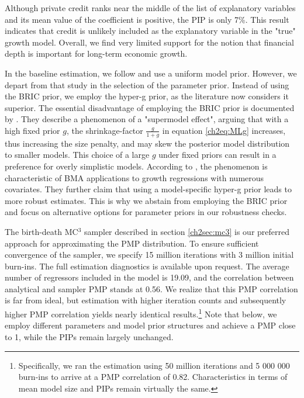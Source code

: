 \begin{refsection}
Although private credit ranks near the middle of the list of explanatory variables and its mean value of the coefficient is positive, the \ac{PIP} is only 7\%. This result indicates that credit is unlikely included as the explanatory variable in the "true" growth model. Overall, we find very limited support for the notion that financial depth is important for long-term economic growth.

In the baseline estimation, we follow \textcite{Fernandezetal2001} and use a uniform model prior. However, we depart from that study in the selection of the parameter prior. Instead of using the \ac{BRIC} prior, we employ the hyper-g prior, as the literature now considers it superior. The essential disadvantage of employing the \ac{BRIC} prior is documented by \textcite{FeldkircherZeugner2009}. They describe a phenomenon of a "supermodel effect", arguing that with a high fixed prior $g$, the shrinkage-factor $\frac{g}{1+g}$ in equation \ref{ch2eq:MLg} increases, thus increasing the size penalty, and may skew the posterior model distribution to smaller models. This choice of a large $g$ under fixed priors can result in a preference for overly simplistic models. According to \textcite{FeldkircherZeugner2009}, the phenomenon is characteristic of \ac{BMA} applications to growth regressions with numerous covariates. They further claim that using a model-specific hyper-g prior leads to more robust estimates. This is why we abstain from employing the \ac{BRIC} prior and focus on alternative options for parameter priors in our robustness checks.

The birth-death MC$^{3}$ sampler described in section \ref{ch2sec:mc3} is our preferred approach for approximating the \ac{PMP} distribution. To ensure sufficient convergence of the sampler, we specify 15 million iterations with 3 million  initial burn-ins. The full estimation diagnostics is available upon request. The average number of regressors included in the model is 19.09, and the correlation between analytical and sampler \ac{PMP} stands at 0.56. We realize that this \ac{PMP} correlation is far from ideal, but estimation with higher iteration counts and subsequently higher \ac{PMP} correlation yields nearly identical results.\footnote{Specifically, we ran the estimation using 50 million iterations and 5 000 000 burn-ins to arrive at a \ac{PMP} correlation of 0.82. Characteristics in terms of mean model size and \acp{PIP} remain virtually the same.} Note that below, we employ different parameters and model prior structures and achieve a \ac{PMP} close to 1, while the \acp{PIP} remain largely unchanged. 


\end{refsection}
